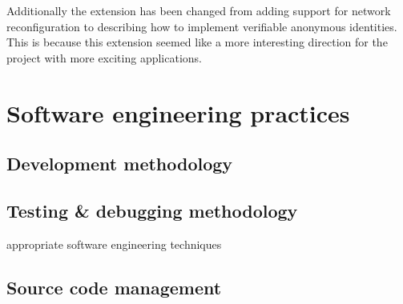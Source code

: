 Additionally the extension has been changed from adding support for network reconfiguration to describing how to implement verifiable anonymous identities. This is because this extension seemed like a more interesting direction for the project with more exciting applications.

\section{Software engineering practices}
\subsection{Development methodology}
\subsection{Testing \& debugging methodology}
appropriate software engineering techniques
\subsection{Source code management}